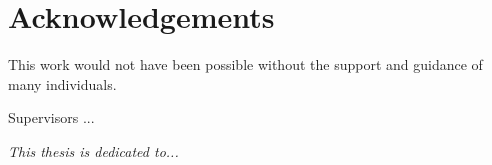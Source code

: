 \chapter*{Acknowledgements}
\begingroup
\setlength{\parskip}{1em}

This work would not have been possible without the support and guidance of many individuals.

\noindent Supervisors ... 

\vspace{0.8em}


\vspace*{\fill}

\begin{flushright}
    \textit{\large This thesis is dedicated to...}
\end{flushright}

\endgroup
